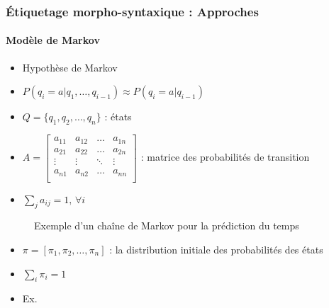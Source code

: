 \documentclass[xcolor=table]{beamer}
\begin{document}
\begin{frame}[fragile]
\frametitle{Étiquetage morpho-syntaxique : Approches}
\framesubtitle{Modèle de Markov}

\begin{minipage}{.64\textwidth}
	\begin{itemize}
		\item Hypothèse de Markov
		\item $ P(q_i = a | q_1, \ldots, q_{i-1}) \approx P(q_i = a | q_{i-1}) $
		\item $Q = \{q_1, q_2, \ldots, q_n\}$ : états
		\item $A = \begin{bmatrix}%
		a_{11} & a_{12} & \ldots & a_{1n} \\
		a_{21} & a_{22} & \ldots & a_{2n} \\
		\vdots & \vdots & \ddots & \vdots \\
		a_{n1} & a_{n2} & \ldots & a_{nn} \\
		\end{bmatrix}$ : matrice des probabilités de transition
		\item $\sum_j a_{ij} = 1,\, \forall i$
	\end{itemize}
\end{minipage}
\begin{minipage}{.35\textwidth}
	\begin{figure}
		\caption{Exemple d'un chaîne de Markov pour la prédiction du temps \cite{2019-jurafsky-martin}}
	\end{figure}
\end{minipage}

\begin{itemize}
	\item $\pi = [\pi_1, \pi_2, \ldots, \pi_n ]$ : la distribution initiale des probabilités des états
	\item $\sum_i \pi_i = 1$
	\item Ex. 
\end{itemize}

\end{frame}
\end{document}
